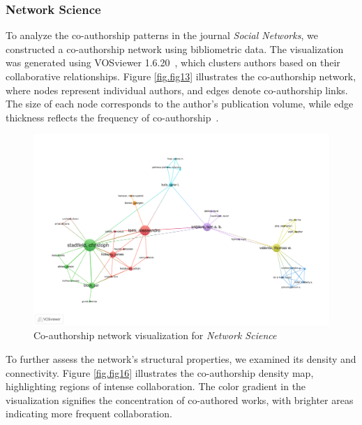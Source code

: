 \documentclass[twocolumn]{article}
\begin{document}
		\subsubsection*{Network Science}
		
		To analyze the co-authorship patterns in the journal \textit{Social Networks}, we constructed a co-authorship network using bibliometric data. The visualization was generated using VOSviewer 1.6.20~\cite{van2010software}, which clusters authors based on their collaborative relationships. Figure \ref{fig.fig13} illustrates the co-authorship network, where nodes represent individual authors, and edges denote co-authorship links. The size of each node corresponds to the author's publication volume, while edge thickness reflects the frequency of co-authorship~\cite{glanzel2004handbook, newman2004coauthorship}.
		
		
		\begin{figure}[htbp]
			\centering
			\includegraphics[width=\columnwidth]{Network Science/VOS/co-authorship.pdf}
			\caption{Co-authorship network visualization for \textit{Network Science}}
			\label{fig.fig15}
		\end{figure}
		
		To further assess the network’s structural properties, we examined its density and connectivity. Figure \ref{fig.fig16} illustrates the co-authorship density map, highlighting regions of intense collaboration. The color gradient in the visualization signifies the concentration of co-authored works, with brighter areas indicating more frequent collaboration.
		
\end{document}
